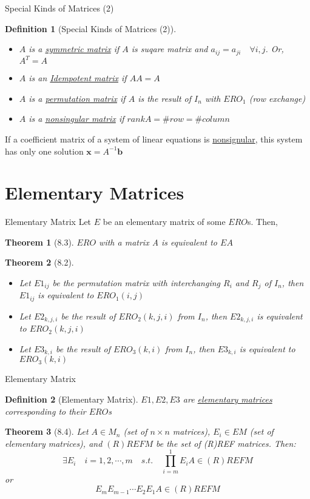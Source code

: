 \documentclass[final]{beamer}
\newtheorem{defn}{Definition}
\newtheorem{thm}{Theorem}
\begin{document}
\begin{frame}[t]{Special Kinds of Matrices (2)}
	\begin{defn}
		[Special Kinds of Matrices (2)]
		\begin{itemize}
			\item $A$ is a \uline{symmetric matrix} if $A$ is suqare matrix and $a_{ij}=a_{ji}\quad\forall i,j$. Or, $A^T = A$
			\item $A$ is an \uline{Idempotent matrix} if $AA=A$
			\item $A$ is a \uline{permutation matrix} if $A$ is the result of $I_n$ with $ERO_1$ (row exchange)
			\item $A$ is a \uline{nonsingular matrix} if $rank A = \# row = \# column$
		\end{itemize}
	\end{defn}
	If a coefficient matrix of a system of linear equations is \uline{nonsignular}, this system has only one solution $\mathbf{x} = A^{-1}\mathbf{b}$
\end{frame}

\section{Elementary Matrices} %
\label{sec:elementary_matrices}
\begin{frame}[t]{Elementary Matrix}
	Let $E$ be an elementary matrix of some $ERO$s. Then, 
	\begin{thm}
		[8.3] $ERO$ with a matrix A is equivalent to $EA$
	\end{thm}
	\begin{thm}
		[8.2] \begin{itemize}
			\item Let $E1_{ij}$ be the permutation matrix with interchanging $R_i$ and $R_j$ of $I_n$, then $E1_{ij}$ is equivalent to $ERO_1(i,j)$
			\item Let $E2_{k,j,i}$ be the result of $ERO_2(k,j,i)$ from $I_n$, then $E2_{k,j,i}$ is equivalent to $ERO_2(k,j,i)$
			\item Let $E3_{k,i}$ be the result of $ERO_3(k,i)$ from $I_n$, then $E3_{k,i}$ is equivalent to $ERO_3(k,i)$
		\end{itemize}
	\end{thm}
\end{frame}
\begin{frame}[t]{Elementary Matrix}
	\begin{defn}
		[Elementary Matrix]
		$E1,E2,E3$ are \uline{elementary matrices} corresponding to their $ERO$s
	\end{defn}
	\begin{thm}
		[8.4] Let $A\in M_n$ (set of $n\times n$ matrices), $E_i\in EM$ (set of elementary matrices), and $(R)REFM$ be the set of (R)REF matrices. Then: \[
			\exists E_i\quad i=1,2,\cdots,m\quad s.t.\quad \prod_{i=m}^1E_i A \in (R)REFM
		\] or \[
			E_m E_{m-1}\cdots E_2E_1 A \in (R)REFM
		\]
	\end{thm}
\end{frame}
\end{document}
